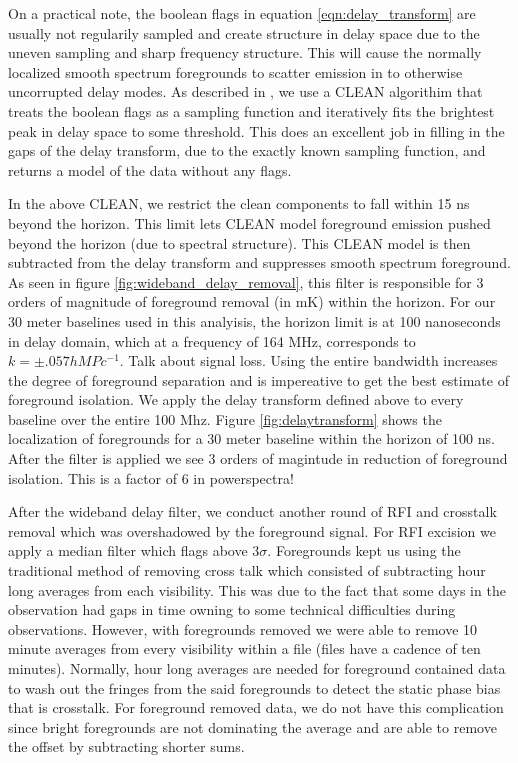 \documentclass[twocolumn,numberedappendix]{emulateapj}
\begin{document}
On a practical note, the boolean flags in equation \ref{eqn:delay_transform} are
usually not regularily sampled and create structure in delay space due to the
uneven sampling and sharp frequency structure. This will cause the normally
localized smooth spectrum foregrounds to scatter emission in to otherwise
uncorrupted delay modes. As described in \cite{parsons_backer2009}, we use a
CLEAN algorithim that treats the boolean flags as a sampling function and
iteratively fits the brightest peak in delay space to some threshold. This does
an excellent job in filling in the gaps of the delay transform, due to the
exactly known sampling function, and returns a model of the data without any
flags. 

In the above CLEAN, we restrict the clean components to fall within 15 ns beyond
the horizon. This limit lets CLEAN model foreground emission pushed beyond the
horizon (due to spectral structure). This CLEAN model is then subtracted from
the delay transform and suppresses smooth spectrum foreground. As seen in figure
\ref{fig:wideband_delay_removal}, this filter is responsible for 3 orders of
magnitude of foreground removal (in mK) within the horizon. For our 30 meter baselines
used in this analyisis, the horizon limit is at 100 nanoseconds in delay domain,
which at a frequency of 164 MHz, corresponds to $k = \pm .057 h MPc^{-1}$.
Talk about signal loss.
Using the entire bandwidth increases the degree of foreground separation and is
impereative to get the best estimate of foreground isolation. We apply the delay
transform defined above to every baseline over the entire 100 Mhz. Figure
\ref{fig:delaytransform} shows the localization of foregrounds for a 30 meter
baseline within the horizon of 100 ns. After the filter is applied we see 3
orders of magintude in reduction of foreground isolation.  This is a factor of 6
in powerspectra! 

After the wideband delay filter, we conduct another round of RFI and crosstalk
removal which was overshadowed by the foreground signal. For RFI excision we
apply a median filter which flags above $3\sigma$. Foregrounds kept us using the
traditional method of removing cross talk which consisted of subtracting hour
long averages from each visibility. This was due to the fact that some days in
the observation had gaps in time owning to some technical difficulties during
observations. However, with foregrounds removed we were able to remove 10 minute
averages from every visibility within a file (files have a cadence of ten
minutes). Normally, hour long averages are needed for foreground contained data
to wash out the fringes from the said foregrounds to detect the static phase
bias that is crosstalk. For foreground removed data, we do not have this
complication since bright foregrounds are not dominating the average and are
able to remove the offset by subtracting shorter sums.
\end{document}
